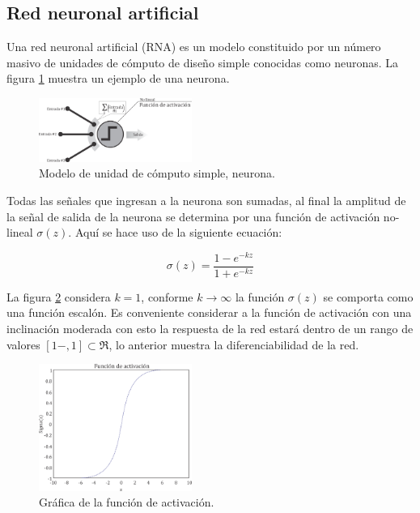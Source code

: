 \subsection{Red neuronal artificial}
Una red neuronal artificial (RNA) es un modelo constituido por un
n\'umero masivo de unidades de c\'omputo de dise\~no simple
conocidas como neuronas. La figura \ref{fig:neuron}  muestra un ejemplo
de una neurona.

\begin{figure}[H]
	\centering
	\includegraphics[width=5cm]{img/fig_neuron.png}
	\caption{Modelo de unidad de c\'omputo simple, neurona.}
	\label{fig:neuron}
\end{figure}

Todas las se\~nales que ingresan a la neurona son sumadas,
al final la amplitud de la se\~nal de salida de la neurona se
determina por una funci\'on de activaci\'on no-lineal $\sigma(z)$. Aqu\'i
se hace uso de la siguiente ecuaci\'on: 

\begin{equation}
	\sigma(z)=\frac{1-e^{-kz}}{1+e^{-kz}}
\end{equation}

La figura \ref{fig:activationFunc} considera $k=1$, conforme $k\rightarrow\infty$ la funci\'on
$\sigma(z)$ se comporta como una funci\'on escal\'on. Es conveniente
considerar a la funci\'on de activaci\'on con una inclinaci\'on
moderada con esto la respuesta de la red estar\'a dentro de un
rango de valores $\left[1-,1\right]\subset\Re$, lo anterior muestra la diferenciabilidad
de la red.

\begin{figure}[H]
	\centering
	\includegraphics[width=5cm]{img/fig_activationFunction.png}
	\caption{Gr\'afica de  la funci\'on de activaci\'on.}
	\label{fig:activationFunc}
\end{figure}

